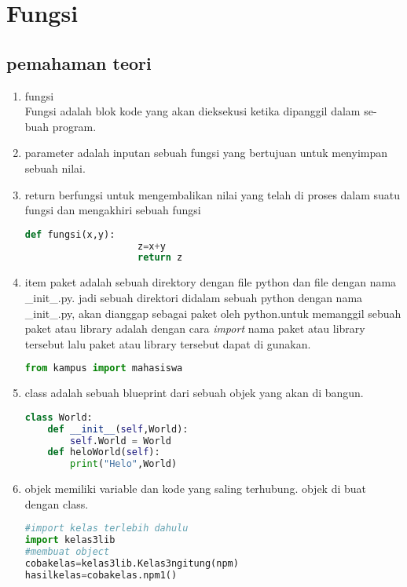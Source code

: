 \section{Fungsi}
	\subsection{pemahaman teori}
		\begin{enumerate}
			\item fungsi\\
			Fungsi adalah blok kode yang akan dieksekusi ketika dipanggil dalam se-
            buah program.\\
			
			\item parameter adalah inputan sebuah fungsi yang bertujuan untuk menyimpan sebuah nilai.
			
			\item return berfungsi untuk mengembalikan nilai yang telah di proses dalam suatu fungsi dan mengakhiri sebuah fungsi
			\begin{lstlisting}[language=Python]
			def fungsi(x,y):
					z=x+y
					return z
			\end{lstlisting}
			
			\item item paket adalah sebuah direktory dengan file python dan file dengan nama \_init\_.py. jadi sebuah direktori didalam sebuah python dengan nama \_init\_.py, akan dianggap sebagai paket oleh python.untuk memanggil sebuah paket atau library adalah dengan cara \textit{import} nama paket atau library tersebut lalu paket atau library tersebut dapat di gunakan.
			\begin{lstlisting}[language=Python]
			from kampus import mahasiswa
			\end{lstlisting}
			
			\item class adalah sebuah blueprint dari sebuah objek yang akan di bangun.
			\begin{lstlisting}[language=Python]
class World:
    def __init__(self,World):
        self.World = World
    def heloWorld(self):
        print("Helo",World)
			\end{lstlisting}
			
			\item objek memiliki variable dan kode yang saling terhubung. objek di buat dengan class.
			\begin{lstlisting}[language=Python]
#import kelas terlebih dahulu
import kelas3lib
#membuat object
cobakelas=kelas3lib.Kelas3ngitung(npm) 
hasilkelas=cobakelas.npm1()
			\end{lstlisting}
			

\end{enumerate}

